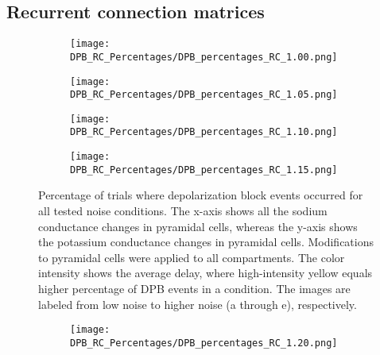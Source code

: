 \subsection{Recurrent connection matrices}\label{subsec:recurrent_connection_matrices}
\begin{figure}[H]
    \centering
    \begin{subfigure}{0.48\textwidth}
        \texttt{[image: DPB\_RC\_Percentages/DPB\_percentages\_RC\_1.00.png]}
        \caption{} %
    \end{subfigure}\hfill
    \begin{subfigure}{0.48\textwidth}
        \texttt{[image: DPB\_RC\_Percentages/DPB\_percentages\_RC\_1.05.png]}
        \caption{} %
    \end{subfigure}

    \bigskip %

    \begin{subfigure}{0.48\textwidth}
        \texttt{[image: DPB\_RC\_Percentages/DPB\_percentages\_RC\_1.10.png]}
        \caption{} %
    \end{subfigure}\hfill
    \begin{subfigure}{0.48\textwidth}
        \texttt{[image: DPB\_RC\_Percentages/DPB\_percentages\_RC\_1.15.png]}
        \caption{} %
    \end{subfigure}

    \caption[RC DPB percentage matrices (all)]{Percentage of trials where depolarization block events occurred for all tested noise conditions.
        The x-axis shows all the sodium conductance changes in pyramidal cells, whereas the y-axis shows the potassium conductance changes in pyramidal cells.
        Modifications to pyramidal cells were applied to all compartments.
        The color intensity shows the average delay, where high-intensity yellow equals higher percentage of DPB events in a condition.
        The images are labeled from low noise to higher noise (a through e), respectively.}\label{fig:rc_dpb_percentage_matrices_all}
\end{figure}

\begin{figure}[H] \ContinuedFloat
    \centering
    \begin{subfigure}{0.48\textwidth}
        \texttt{[image: DPB\_RC\_Percentages/DPB\_percentages\_RC\_1.20.png]}
        \caption{} %
    \end{subfigure}\hfill
\end{figure}
